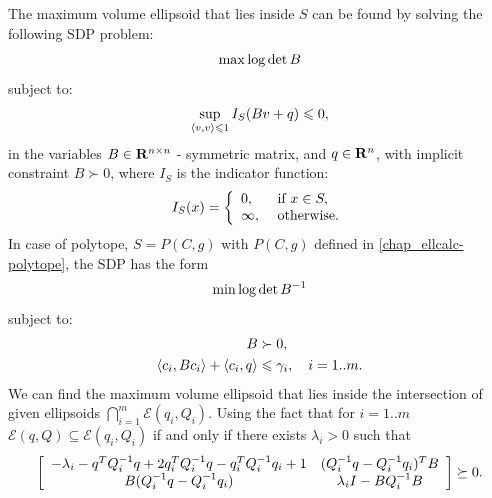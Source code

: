 \documentclass[letterpaper,10pt,english]{sphinxmanual}
\begin{document}
The maximum volume ellipsoid that lies inside \(S\) can be found by
solving the following SDP problem:
\begin{gather}
\begin{split}\max \log \det B\end{split}\notag
\end{gather}
subject to:
\begin{gather}
\begin{split}\sup_{\langle v,v\rangle\leqslant1} I_S(Bv+q)\leqslant0 ,\end{split}\notag
\end{gather}
in the variables \(B\in{\bf R}^{n\times n}\) - symmetric matrix,
and \(q\in{\bf R}^n\), with implicit constraint \(B\succ 0\),
where \(I_S\) is the indicator function:
\begin{gather}
\begin{split}I_S(x) = \left\{\begin{array}{ll}
0, & \mbox{ if } x\in S,\\
\infty, & \mbox{ otherwise.}\end{array}\right.\end{split}\notag
\end{gather}
In case of polytope, \(S=P(C,g)\) with \(P(C,g)\) defined in
\eqref{chap_ellcalc-polytope}, the SDP has the form
\begin{gather}
\begin{split}\min \log \det B^{-1}\end{split}\notag
\end{gather}
subject to:
\begin{gather}
\begin{split}\begin{aligned}
B & \succ 0,\\
\langle c_i, Bc_i\rangle + \langle c_i, q\rangle & \leqslant \gamma_i,
~~~ i=1..m.\end{aligned}\end{split}\notag
\end{gather}
We can find the maximum volume ellipsoid that lies inside the
intersection of given ellipsoids
\(\bigcap_{i=1}^m{\mathcal E}(q_i,Q_i)\). Using the fact that for
\(i=1..m\) \({\mathcal E}(q,Q)\subseteq{\mathcal E}(q_i,Q_i)\)
if and only if there exists \(\lambda_i>0\) such that
\begin{gather}
\begin{split}\left[\begin{array}{cc}
-\lambda_i - q^TQ_i^{-1}q + 2q_i^TQ_i^{-1}q - q_i^TQ_i^{-1}q_i + 1 & (Q_i^{-1}q-Q_i^{-1}q_i)^TB\\
B(Q_i^{-1}q-Q_i^{-1}q_i) & \lambda_iI-BQ_i^{-1}B\end{array}\right] \succeq 0.\end{split}\notag
\end{gather}
\end{document}
